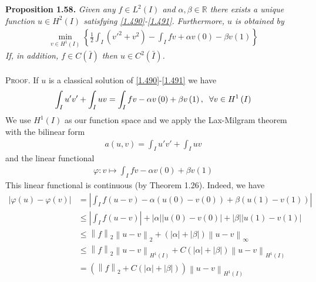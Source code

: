 \documentclass[a4paper,oneside]{article}
\numberwithin{equation}{section}
\begin{document}
\textbf{Proposition 1.58.} \textit{Given any $f\in L^2\left(I\right)$ and $\alpha,\beta\in \mathbb{R}$ there exists a unique function $u\in H^2\left(I\right)$ satisfying \eqref{1.490}-\eqref{1.491}. Furthermore, $u$ is obtained by}
\begin{align}
\mathop {\min }\limits_{v \in {H^1}\left( I \right)} \left\{ {\frac{1}{2}\int_I {\left( {v{'^2} + {v^2}} \right)}  - \int_I {fv}  + \alpha v\left( 0 \right) - \beta v\left( 1 \right)} \right\}
\end{align}
\textit{If, in addition, $f\in C\left(\bar I\right)$ then $u\in C^2\left(\bar I\right)$.}\\
\\
\textsc{Proof.} If $u$ is a classical solution of \eqref{1.490}-\eqref{1.491} we have
\begin{align}
\int_I {u'v'}  + \int_I {uv}  = \int_I {fv}  - \alpha v\left( 0 \right) + \beta v\left( 1 \right),\hspace{0.2cm}\forall v \in {H^1}\left( I \right)
\end{align}
We use $H^1\left(I\right)$ as our function space and we apply the Lax-Milgram theorem with the bilinear form 
\begin{align}
a\left( {u,v} \right) = \int_I {u'v'}  + \int_I {uv} 
\end{align}
and the linear functional
\begin{align}
\varphi :v \mapsto \int_I {fv}  - \alpha v\left( 0 \right) + \beta v\left( 1 \right)
\end{align}
This linear functional is continuous (by Theorem 1.26). Indeed, we have
\begin{align}
\left| {\varphi \left( u \right) - \varphi \left( v \right)} \right| &= \left| {\int_I {f\left( {u - v} \right)}  - \alpha \left( {u\left( 0 \right) - v\left( 0 \right)} \right) + \beta \left( {u\left( 1 \right) - v\left( 1 \right)} \right)} \right|\\
& \le \left| {\int_I {f\left( {u - v} \right)} } \right| + \left| \alpha  \right|\left| {u\left( 0 \right) - v\left( 0 \right)} \right| + \left| \beta  \right|\left| {u\left( 1 \right) - v\left( 1 \right)} \right|\\
& \le {\left\| f \right\|_2}{\left\| {u - v} \right\|_2} + \left( {\left| \alpha  \right| + \left| \beta  \right|} \right){\left\| {u - v} \right\|_\infty }\\
& \le {\left\| f \right\|_2}{\left\| {u - v} \right\|_{{H^1}\left( I \right)}} + C\left( {\left| \alpha  \right| + \left| \beta  \right|} \right){\left\| {u - v} \right\|_{{H^1}\left( I \right)}}\\
& = \left( {{{\left\| f \right\|}_2} + C\left( {\left| \alpha  \right| + \left| \beta  \right|} \right)} \right){\left\| {u - v} \right\|_{{H^1}\left( I \right)}}
\end{align}
\end{document}
